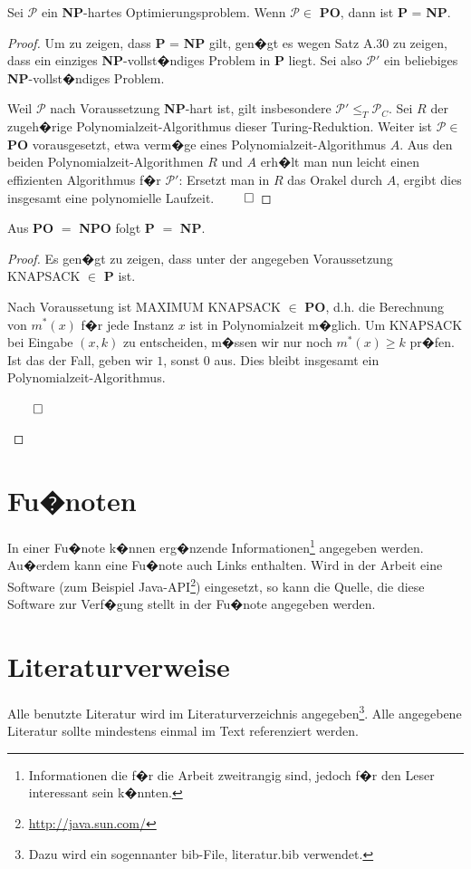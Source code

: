 \begin{theorem} Sei $\mathcal{P}$ ein \textbf{NP}-hartes Optimierungsproblem.
Wenn $\mathcal{P} \in$ \textbf{PO}, dann ist \textbf{P} = \textbf{NP}.
\end{theorem}

\begin{proof} Um zu zeigen, dass \textbf{P} = \textbf{NP} gilt, gen�gt es
wegen Satz A.30 zu zeigen, dass ein einziges \textbf{NP}-vollst�ndiges
Problem in \textbf{P} liegt. Sei also $\mathcal{P}'$ ein beliebiges \textbf{NP}-vollst�ndiges Problem.

Weil $\mathcal{P}$ nach Voraussetzung \textbf{NP}-hart ist, gilt insbesondere
$\mathcal{P}' \leq_T \mathcal{P}_C$. Sei $R$ der zugeh�rige
Polynomialzeit-Algorithmus dieser Turing-Reduktion.
Weiter ist $\mathcal{P} \in$ \textbf{PO} vorausgesetzt, etwa verm�ge eines
Polynomialzeit-Algorithmus $A$. Aus den beiden
Polynomialzeit-Algorithmen $R$ und $A$ erh�lt man nun
leicht einen effizienten Algorithmus f�r $\mathcal{P}'$: Ersetzt man
in $R$ das Orakel durch $A$, ergibt dies insgesamt eine polynomielle
Laufzeit. 
$\qed$
\end{proof}

\begin{lemma} Aus \textbf{PO} $=$ \textbf{NPO} folgt \textbf{P} $=$ \textbf{NP}.
\end{lemma}

\begin{proof} Es gen�gt zu zeigen, dass unter der angegeben
Voraussetzung KNAPSACK $\in$ \textbf{P} ist.

Nach Voraussetung ist MAXIMUM KNAPSACK $\in$ \textbf{PO},
d.h. die Berechnung von $m^*(x)$ f�r jede Instanz $x$ ist
in Polynomialzeit m�glich. Um KNAPSACK bei Eingabe
$(x,k)$ zu entscheiden, m�ssen wir nur noch $m^*(x) \geq k$
pr�fen. Ist das der Fall, geben wir $1$, sonst $0$ aus. Dies
bleibt insgesamt ein Polynomialzeit-Algorithmus. 
\begin{flushright}
$\qed$
\end{flushright}
\end{proof}

\section{Fu�noten}

In einer Fu�note k�nnen erg�nzende Informationen\footnote{Informationen die f�r die Arbeit zweitrangig sind, jedoch f�r den Leser interessant sein k�nnten.} angegeben werden. Au�erdem kann eine Fu�note auch Links enthalten. Wird in der Arbeit eine Software (zum Beispiel Java-API\footnote{\url{http://java.sun.com/}}) eingesetzt, so kann die Quelle, die diese Software zur Verf�gung stellt in der Fu�note angegeben werden.

\section{Literaturverweise}
Alle benutzte Literatur wird im Literaturverzeichnis angegeben\footnote{Dazu wird ein sogennanter bib-File, literatur.bib verwendet.}. Alle angegebene Literatur sollte mindestens einmal im Text referenziert werden\cite{Coulouris:02}.